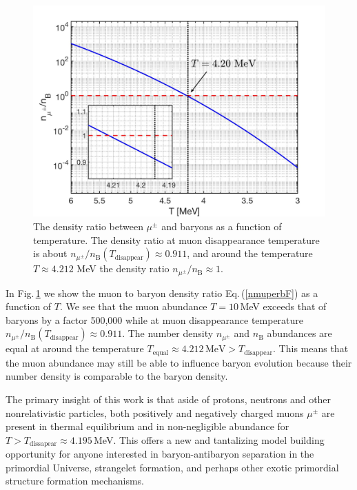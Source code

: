 \begin{figure}[t]
\begin{center}
\includegraphics[width=\linewidth]{./plots/DensityRatio_new2.jpg}
\caption{
The density ratio between $\mu^\pm$ and baryons as a function of temperature. The density ratio at muon disappearance temperature is about $n_{\mu^\pm}/n_\mathrm{B}(T_\mathrm{disappear})\approx0.911$, and around the temperature $T\approx4.212$ MeV the density ratio $n_{\mu^\pm}/n_\mathrm{B}\approx1$.}
\label{DensityRatio_fig}
\end{center}
\end{figure}


In Fig.\,\ref{DensityRatio_fig} we show the muon to baryon density ratio Eq.\,(\ref{nmuperbF}) as a function of $T$. We see that the muon abundance $T=10$\,MeV exceeds that of baryons by a factor 500,000 while at muon disappearance temperature $n_{\mu^\pm}/n_\mathrm{B}(T_\mathrm{disappear})\approx0.911$. The number density $n_{\mu^\pm}$ and $n_\mathrm{B}$  abundances are equal at around the temperature $T_\mathrm{equal}\approx4.212\,\mathrm{MeV} >  T_\mathrm{disappear}$.  This means that the muon abundance may still be able to influence baryon evolution because their number density is comparable to the baryon density.%

The primary insight of this work is that aside of protons, neutrons and other nonrelativistic particles, both positively and negatively charged muons $\mu^\pm$ are present in thermal equilibrium and in non-negligible abundance for $T>T_\mathrm{dissapear}\approx 4.195$\,MeV. This offers a new and tantalizing model building opportunity for anyone interested in baryon-antibaryon separation in the primordial Universe, strangelet formation, and perhaps other exotic primordial structure formation mechanisms.
